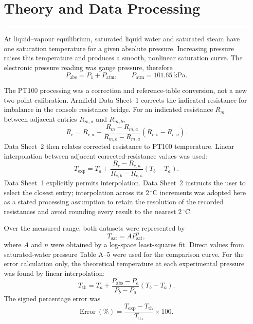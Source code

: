 \documentclass[11pt,a4paper]{article}
\newcommand{\sectionrule}{\vspace{-2pt}\color{rulegray}\hrule\color{black}\vspace{5pt}}
\begin{document}
\section{Theory and Data Processing}
\sectionrule
At liquid--vapour equilibrium, saturated liquid water and saturated steam have
one saturation temperature for a given absolute pressure. Increasing pressure
raises this temperature and produces a smooth, nonlinear saturation curve.
The electronic pressure reading was gauge pressure, therefore
\begin{equation}
  P_{\mathrm{abs}}=P_1+P_{\mathrm{atm}},
  \qquad P_{\mathrm{atm}}=\SI{101.65}{\kilo\pascal}.
  \label{eq:pressure}
\end{equation}

The PT100 processing was a correction and reference-table conversion, not a
new two-point calibration. Armfield Data Sheet~1 corrects the indicated
resistance for imbalance in the console resistance bridge. For an indicated
resistance $R_m$ between adjacent entries $R_{m,a}$ and $R_{m,b}$,
\begin{equation}
 R_c=R_{c,a}+\frac{R_m-R_{m,a}}{R_{m,b}-R_{m,a}}
 (R_{c,b}-R_{c,a}).
 \label{eq:bridge}
\end{equation}
Data Sheet~2 then relates corrected resistance to PT100 temperature. Linear
interpolation between adjacent corrected-resistance values was used:
\begin{equation}
 T_{\mathrm{exp}}=T_a+\frac{R_c-R_{c,a}}{R_{c,b}-R_{c,a}}(T_b-T_a).
 \label{eq:pt100}
\end{equation}
Data Sheet~1 explicitly permits interpolation. Data Sheet~2 instructs the user
to select the closest entry; interpolation across its $2\,{}^\circ\mathrm{C}$
increments was adopted here as a stated processing assumption to retain the
resolution of the recorded resistances and avoid rounding every result to the
nearest $2\,{}^\circ\mathrm{C}$.

Over the measured range, both datasets were represented by
\begin{equation}
  T_{\mathrm{sat}}=AP_{\mathrm{sat}}^n,
  \label{eq:power}
\end{equation}
where $A$ and $n$ were obtained by a log-space least-squares fit. Direct values
from saturated-water pressure Table A--5 were used for the comparison curve.
For the error calculation only, the theoretical temperature at each
experimental pressure was found by linear interpolation:
\begin{equation}
  T_{\mathrm{th}}=T_a+\frac{P_{\mathrm{abs}}-P_a}{P_b-P_a}(T_b-T_a).
  \label{eq:interpolation}
\end{equation}
The signed percentage error was
\begin{equation}
  \mathrm{Error}\ (\%)=\frac{T_{\mathrm{exp}}-T_{\mathrm{th}}}
  {T_{\mathrm{th}}}\times100.
  \label{eq:error}
\end{equation}
\end{document}
